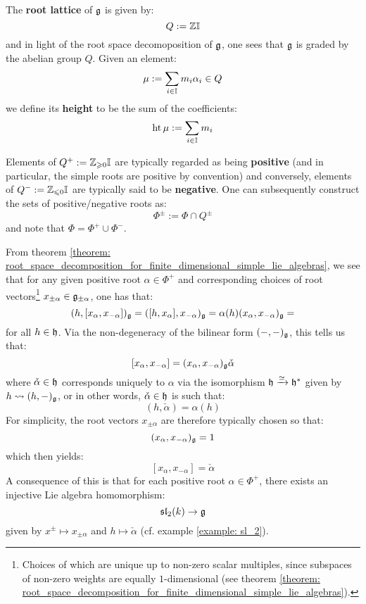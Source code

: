         
        The \textbf{root lattice} of $\mathfrak{g}$ is given by:
            $$Q := \mathbb{Z} \mathbb{I}$$
        and in light of the root space decomoposition of $\mathfrak{g}$, one sees that $\mathfrak{g}$ is graded by the abelian group $Q$. Given an element:
            $$\mu := \sum_{i \in \mathbb{I}} m_i \alpha_i \in Q$$
        we define its \textbf{height} to be the sum of the coefficients:
            $$\operatorname{ht} \mu := \sum_{i \in \mathbb{I}} m_i$$

        Elements of $Q^+ := \mathbb{Z}_{\geqslant 0} \mathbb{I}$ are typically regarded as being \textbf{positive} (and in particular, the simple roots are positive by convention) and conversely, elements of $Q^- := \mathbb{Z}_{\leqslant 0} \mathbb{I}$ are typically said to be \textbf{negative}. One can subsequently construct the sets of positive/negative roots as:
            $$\Phi^{\pm} := \Phi \cap Q^{\pm}$$
        and note that $\Phi = \Phi^+ \cup \Phi^-$.

        From theorem \ref{theorem: root_space_decomposition_for_finite_dimensional_simple_lie_algebras}, we see that for any given positive root $\alpha \in \Phi^+$ and corresponding choices of root vectors\footnote{Choices of which are unique up to non-zero scalar multiples, since subspaces of non-zero weights are equally $1$-dimensional (see theorem \ref{theorem: root_space_decomposition_for_finite_dimensional_simple_lie_algebras}).} $x_{\pm\alpha} \in \mathfrak{g}_{\pm\alpha}$, one has that:
            $$(h, [x_{\alpha}, x_{-\alpha}])_{\mathfrak{g}} = ([h, x_{\alpha}], x_{-\alpha})_{\mathfrak{g}} = \alpha(h) (x_{\alpha}, x_{-\alpha})_{\mathfrak{g}} = $$
        for all $h \in \mathfrak{h}$. Via the non-degeneracy of the bilinear form $(-, -)_{\mathfrak{g}}$, this tells us that:
            $$[x_{\alpha}, x_{-\alpha}] = (x_{\alpha}, x_{-\alpha})_{\mathfrak{g}} \check{\alpha}$$
        where $\check{\alpha} \in \mathfrak{h}$ corresponds uniquely to $\alpha$ via the isomorphism $\mathfrak{h} \xrightarrow[]{\simeq} \mathfrak{h}^*$ given by $h \leadsto (h, -)_{\mathfrak{g}}$, or in other words, $\check{\alpha} \in \mathfrak{h}$ is such that:
            $$(h, \check{\alpha}) = \alpha(h)$$
        For simplicity, the root vectors $x_{\pm \alpha}$ are therefore typically chosen so that:
            $$(x_{\alpha}, x_{-\alpha})_{\mathfrak{g}} = 1$$
        which then yields:
            $$[x_{\alpha}, x_{-\alpha}] = \check{\alpha}$$
        A consequence of this is that for each positive root $\alpha \in \Phi^+$, there exists an injective Lie algebra homomorphism:
            $$\mathfrak{sl}_2(k) \to \mathfrak{g}$$
        given by $x^{\pm} \mapsto x_{\pm \alpha}$ and $h \mapsto \check{\alpha}$ (cf. example \ref{example: sl_2}).
        
